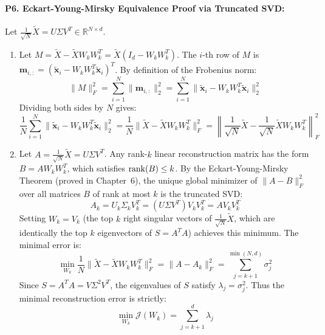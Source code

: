 \paragraph{P6. Eckart-Young-Mirsky Equivalence Proof via Truncated SVD:}
Let $\frac{1}{\sqrt{N}}\tilde{X} = U \Sigma V^T \in \mathbb{R}^{N \times d}$.
\begin{enumerate}[label=(\alph*)]
    \item Let $M = \tilde{X} - \tilde{X}W_k W_k^T = \tilde{X}(I_d - W_k W_k^T)$. The $i$-th row of $M$ is $\mathbf{m}_{i,:} = (\tilde{\mathbf{x}}_i - W_k W_k^T \tilde{\mathbf{x}}_i)^T$.
    By definition of the Frobenius norm:
    \[
    \|M\|_F^2 = \sum_{i=1}^N \|\mathbf{m}_{i,:}\|_2^2 = \sum_{i=1}^N \|\tilde{\mathbf{x}}_i - W_k W_k^T \tilde{\mathbf{x}}_i\|_2^2
    \]
    Dividing both sides by $N$ gives:
    \[
    \frac{1}{N}\sum_{i=1}^N \|\tilde{\mathbf{x}}_i - W_k W_k^T \tilde{\mathbf{x}}_i\|_2^2 = \frac{1}{N}\|\tilde{X} - \tilde{X}W_k W_k^T\|_F^2 = \left\| \frac{1}{\sqrt{N}}\tilde{X} - \frac{1}{\sqrt{N}}\tilde{X} W_k W_k^T \right\|_F^2
    \]
    \item Let $A = \frac{1}{\sqrt{N}}\tilde{X} = U \Sigma V^T$. Any rank-$k$ linear reconstruction matrix has the form $B = A W_k W_k^T$, which satisfies $\operatorname{rank}(B) \le k$.
    By the Eckart-Young-Mirsky Theorem (proved in Chapter~6), the unique global minimizer of $\|A - B\|_F^2$ over all matrices $B$ of rank at most $k$ is the truncated SVD:
    \[
    A_k = U_k \Sigma_k V_k^T = (U \Sigma V^T) V_k V_k^T = A V_k V_k^T
    \]
    Setting $W_k = V_k$ (the top $k$ right singular vectors of $\frac{1}{\sqrt{N}}\tilde{X}$, which are identically the top $k$ eigenvectors of $S = A^T A$) achieves this minimum.
    The minimal error is:
    \[
    \min_{W_k} \frac{1}{N}\|\tilde{X} - \tilde{X} W_k W_k^T\|_F^2 = \|A - A_k\|_F^2 = \sum_{j=k+1}^{\min(N, d)} \sigma_j^2
    \]
    Since $S = A^T A = V \Sigma^2 V^T$, the eigenvalues of $S$ satisfy $\lambda_j = \sigma_j^2$. Thus the minimal reconstruction error is strictly:
    \[
    \min_{W_k} \mathcal{J}(W_k) = \sum_{j=k+1}^d \lambda_j
    \]
\end{enumerate}

